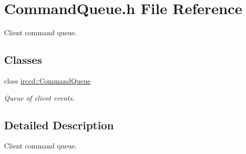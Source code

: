 \hypertarget{a00071}{\section{Command\-Queue.\-h File Reference}
\label{a00071}
}


Client command queue.  


\subsection*{Classes}
\begin{DoxyCompactItemize}
\item 
class \hyperlink{a00005}{irccd\-::\-Command\-Queue}
\begin{DoxyCompactList}\small\item\em Queue of client events. \end{DoxyCompactList}\end{DoxyCompactItemize}


\subsection{Detailed Description}
Client command queue. 